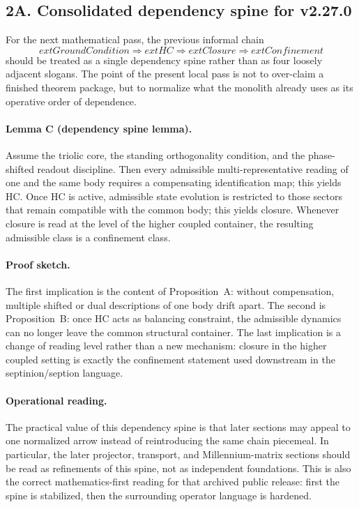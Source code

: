 \subsection*{2A. Consolidated dependency spine for v2.27.0}
For the next mathematical pass, the previous informal chain
\[
	ext{Ground Condition} \Longrightarrow 	ext{HC} \Longrightarrow 	ext{Closure} \Longrightarrow 	ext{Confinement}
\]
should be treated as a single dependency spine rather than as four loosely
adjacent slogans. The point of the present local pass is not to over-claim a
finished theorem package, but to normalize what the monolith already uses as
its operative order of dependence.

\paragraph{Lemma C (dependency spine lemma).}
Assume the triolic core, the standing orthogonality condition, and the
phase-shifted readout discipline. Then every admissible multi-representative
reading of one and the same body requires a compensating identification map;
this yields HC. Once HC is active, admissible state evolution is restricted to
those sectors that remain compatible with the common body; this yields closure.
Whenever closure is read at the level of the higher coupled container, the
resulting admissible class is a confinement class.

\paragraph{Proof sketch.}
The first implication is the content of Proposition~A: without compensation,
multiple shifted or dual descriptions of one body drift apart. The second is
Proposition~B: once HC acts as balancing constraint, the admissible dynamics can
no longer leave the common structural container. The last implication is a
change of reading level rather than a new mechanism: closure in the higher
coupled setting is exactly the confinement statement used downstream in the
septinion/seption language.

\paragraph{Operational reading.}
The practical value of this dependency spine is that later sections may appeal
to one normalized arrow instead of reintroducing the same chain piecemeal. In
particular, the later projector, transport, and Millennium-matrix sections
should be read as refinements of this spine, not as independent foundations.
This is also the correct mathematics-first reading for that archived public release:
first the spine is stabilized, then the surrounding operator language is
hardened.

